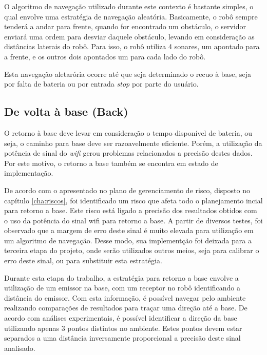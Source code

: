 	 	O algoritmo de navegação utilizado durante este contexto é bastante simples, o qual envolve uma estratégia de navegação aleatória. Basicamente, o robô sempre tenderá a andar para frente, quando for encontrado um obstáculo, o servidor enviará uma ordem para desviar daquele obstáculo, levando em consideração as distâncias laterais do robô. Para isso, o robô utiliza 4 sonares, um apontado para a frente, e os outros dois apontados um para cada lado do robô.

	 	Esta navegação aletarória ocorre até que seja determinado o recuo à base, seja por falta de bateria ou por entrada \textit{stop} por parte do usuário.


	 \subsection{De volta à base (Back)} %
	 \label{sub:de_volta_a_base_}
	 	
	 	O retorno à base deve levar em consideração o tempo disponível de bateria, ou seja, o caminho para base deve ser razoavelmente eficiente. Porém, a utilização da potência de sinal do \textit{wifi} gerou problemas relacionados a precisão destes dados. Por este motivo, o retorno a base também se encontra em estado de implementação. 

	 	De acordo com o apresentado no plano de gerenciamento de risco, disposto no capítulo \ref{cha:riscos}, foi identificado um risco que afeta todo o planejamento incial para retorno a base. Este risco está ligado a precisão dos resultados obtidos com o uso da potência do sinal wifi para retorno a base. A partir de diversos testes, foi observado que a margem de erro deste sinal é muito elevada para utilização em um algoritmo de navegação. Desse modo, sua implementção foi deixada para a terceira etapa do projeto, onde serão utilizados outros meios, seja para calibrar o erro deste sinal, ou para substituir esta estratégia.

	 	Durante esta etapa do trabalho, a estratégia para retorno a base envolve a utilização de um emissor na base, com um receptor no robô identificando a distância do emissor. Com esta informação, é possível navegar pelo ambiente realizando comparações de resultados para traçar uma direção até a base. De acordo com análises experimentais, é possível identificar a direção da base utilizando apenas 3 pontos distintos no ambiente. Estes pontos devem estar separados a uma distância inversamente proporcional a precisão deste sinal analisado.

